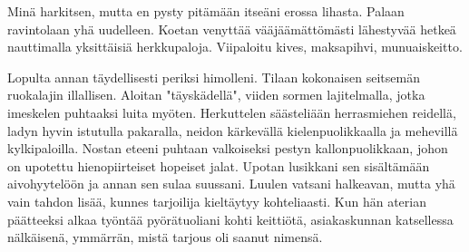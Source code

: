 Minä harkitsen, mutta en pysty pitämään itseäni erossa lihasta. Palaan ravintolaan yhä uudelleen. Koetan venyttää vääjäämättömästi lähestyvää hetkeä nauttimalla yksittäisiä herkkupaloja. Viipaloitu kives, maksapihvi, munuaiskeitto.


Lopulta annan täydellisesti periksi himolleni. Tilaan kokonaisen seitsemän ruokalajin illallisen. Aloitan "täyskädellä", viiden sormen lajitelmalla, jotka imeskelen puhtaaksi luita myöten. Herkuttelen säästeliään herrasmiehen reidellä, ladyn hyvin istutulla pakaralla, neidon kärkevällä kielenpuolikkaalla ja mehevillä kylkipaloilla. Nostan eteeni puhtaan valkoiseksi pestyn kallonpuolikkaan, johon on upotettu hienopiirteiset hopeiset jalat. Upotan lusikkani sen sisältämään aivohyytelöön ja annan sen sulaa suussani. Luulen vatsani halkeavan, mutta yhä vain tahdon lisää, kunnes tarjoilija kieltäytyy kohteliaasti. Kun hän aterian päätteeksi alkaa työntää pyörätuoliani kohti keittiötä, asiakaskunnan katsellessa nälkäisenä, ymmärrän, mistä tarjous oli saanut nimensä.







